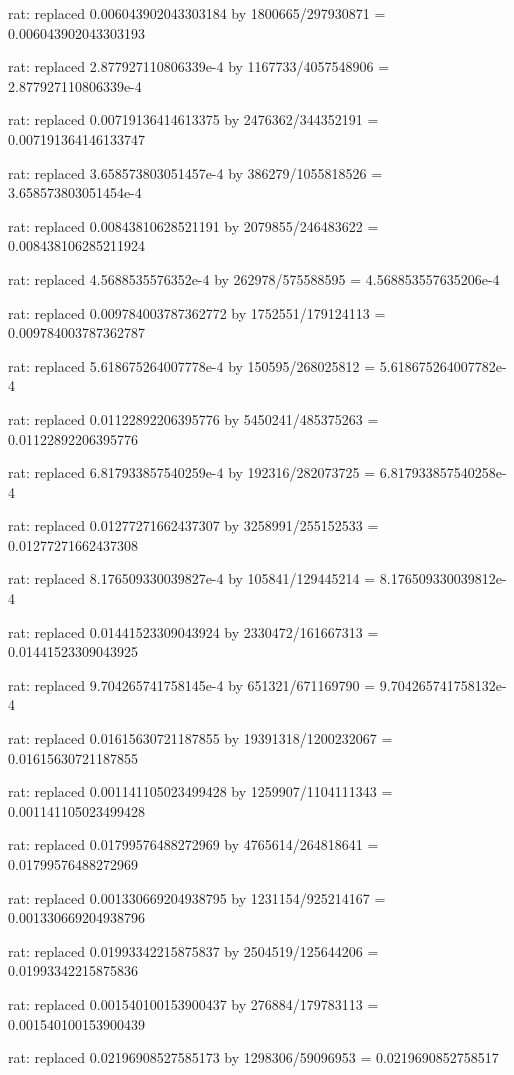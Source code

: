 \documentclass[a4paper,10pt]{article}
\begin{document}
\begin{eulernotebook}
\begin{eulercomment}
\begin{eulercomment}
\begin{eulercomment}
\begin{eulercomment}
\begin{eulercomment}
\begin{eulercomment}
\begin{eulercomment}
\begin{eulercomment}
\begin{eulercomment}
\begin{eulercomment}
\begin{eulercomment}
\begin{eulercomment}
\begin{eulercomment}
\begin{eulercomment}
\begin{eulercomment}
\begin{eulercomment}
\begin{euleroutput}
  rat: replaced 0.006043902043303184 by 1800665/297930871 = 0.006043902043303193
  
  rat: replaced 2.877927110806339e-4 by 1167733/4057548906 = 2.877927110806339e-4
  
  rat: replaced 0.00719136414613375 by 2476362/344352191 = 0.007191364146133747
  
  rat: replaced 3.658573803051457e-4 by 386279/1055818526 = 3.658573803051454e-4
  
  rat: replaced 0.00843810628521191 by 2079855/246483622 = 0.008438106285211924
  
  rat: replaced 4.5688535576352e-4 by 262978/575588595 = 4.568853557635206e-4
  
  rat: replaced 0.009784003787362772 by 1752551/179124113 = 0.009784003787362787
  
  rat: replaced 5.618675264007778e-4 by 150595/268025812 = 5.618675264007782e-4
  
  rat: replaced 0.01122892206395776 by 5450241/485375263 = 0.01122892206395776
  
  rat: replaced 6.817933857540259e-4 by 192316/282073725 = 6.817933857540258e-4
  
  rat: replaced 0.01277271662437307 by 3258991/255152533 = 0.01277271662437308
  
  rat: replaced 8.176509330039827e-4 by 105841/129445214 = 8.176509330039812e-4
  
  rat: replaced 0.01441523309043924 by 2330472/161667313 = 0.01441523309043925
  
  rat: replaced 9.704265741758145e-4 by 651321/671169790 = 9.704265741758132e-4
  
  rat: replaced 0.01615630721187855 by 19391318/1200232067 = 0.01615630721187855
  
  rat: replaced 0.001141105023499428 by 1259907/1104111343 = 0.001141105023499428
  
  rat: replaced 0.01799576488272969 by 4765614/264818641 = 0.01799576488272969
  
  rat: replaced 0.001330669204938795 by 1231154/925214167 = 0.001330669204938796
  
  rat: replaced 0.01993342215875837 by 2504519/125644206 = 0.01993342215875836
  
  rat: replaced 0.001540100153900437 by 276884/179783113 = 0.001540100153900439
  
  rat: replaced 0.02196908527585173 by 1298306/59096953 = 0.0219690852758517
  

\end{euleroutput}
\end{eulercomment}
\end{eulercomment}
\end{eulercomment}
\end{eulercomment}
\end{eulercomment}
\end{eulercomment}
\end{eulercomment}
\end{eulercomment}
\end{eulercomment}
\end{eulercomment}
\end{eulercomment}
\end{eulercomment}
\end{eulercomment}
\end{eulercomment}
\end{eulercomment}
\end{eulercomment}
\end{eulernotebook}
\end{document}
